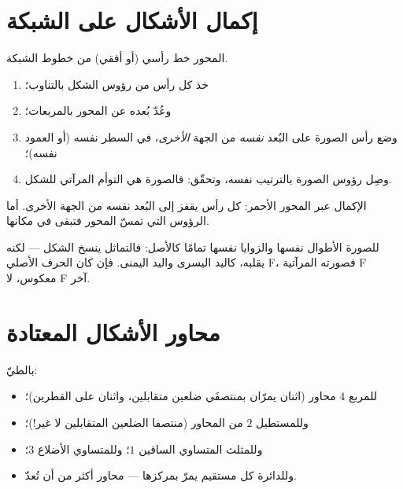 \section{إكمال الأشكال على الشبكة}

\begin{method}\label{met:g4:symmetry:grid}
المحور خط رأسي (أو أفقي) من خطوط الشبكة.
\begin{enumerate}
  \item خذ كل رأس من رؤوس الشكل بالتناوب؛
  \item وعُدّ بُعده عن المحور بالمربعات؛
  \item وضع رأس الصورة على البُعد \emph{نفسه} من الجهة
        \emph{الأخرى}، في السطر نفسه (أو العمود نفسه)؛
  \item وصِل رؤوس الصورة بالترتيب نفسه، وتحقّق: فالصورة
        هي التوأم المرآتي للشكل.
\end{enumerate}
\end{method}

\begin{omfigure}

{\small الإكمال عبر المحور الأحمر: كل رأس يقفز إلى البُعد نفسه
من الجهة الأخرى. أما الرؤوس التي تمسّ المحور فتبقى في
مكانها.}
\end{omfigure}

\begin{example}\label{ex:g4:symmetry:properties}
للصورة الأطوال نفسها والزوايا نفسها تمامًا كالأصل:
فالتماثل ينسخ الشكل --- لكنه يقلبه، كاليد اليسرى واليد اليمنى.
فإن كان الحرف الأصلي F، فصورته المرآتية F معكوس، لا F
آخر.
\end{example}

\section{محاور الأشكال المعتادة}

\begin{example}[عدّ المحاور]\label{ex:g4:symmetry:shapes}
بالطيّ:
\begin{itemize}
  \item للمربع $4$ محاور (اثنان يمرّان بمنتصفَي ضلعين
        متقابلين، واثنان على القطرين)؛
  \item وللمستطيل $2$ من المحاور (منتصفا الضلعين المتقابلين لا غير!)؛
  \item وللمثلث المتساوي الساقين $1$؛ وللمتساوي الأضلاع $3$؛
  \item وللدائرة كل مستقيم يمرّ بمركزها --- محاور أكثر من أن
        تُعدّ.
\end{itemize}
\end{example}

